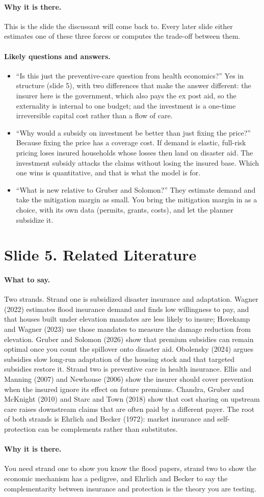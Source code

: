 \documentclass[11pt]{article}
\newcommand{\slide}[2]{\section*{Slide #1. #2}\addcontentsline{toc}{section}{Slide #1. #2}}
\newcommand{\say}{\paragraph{What to say.}}
\newcommand{\why}{\paragraph{Why it is there.}}
\newcommand{\qa}{\paragraph{Likely questions and answers.}}
\begin{document}
\why This is the slide the discussant will come back to. Every later slide either estimates one of these three forces or computes the trade-off between them.

\qa
\begin{itemize}
\item ``Is this just the preventive-care question from health economics?'' Yes in structure (slide 5), with two differences that make the answer different: the insurer here is the government, which also pays the ex post aid, so the externality is internal to one budget; and the investment is a one-time irreversible capital cost rather than a flow of care.
\item ``Why would a subsidy on investment be better than just fixing the price?'' Because fixing the price has a coverage cost. If demand is elastic, full-risk pricing loses insured households whose losses then land on disaster aid. The investment subsidy attacks the claims without losing the insured base. Which one wins is quantitative, and that is what the model is for.
\item ``What is new relative to Gruber and Solomon?'' They estimate demand and take the mitigation margin as small. You bring the mitigation margin in as a choice, with its own data (permits, grants, costs), and let the planner subsidize it.
\end{itemize}

\slide{5}{Related Literature}
\say Two strands. Strand one is subsidized disaster insurance and adaptation. Wagner (2022) estimates flood insurance demand and finds low willingness to pay, and that houses built under elevation mandates are less likely to insure; Hovekamp and Wagner (2023) use those mandates to measure the damage reduction from elevation. Gruber and Solomon (2026) show that premium subsidies can remain optimal once you count the spillover onto disaster aid. Obolensky (2024) argues subsidies slow long-run adaptation of the housing stock and that targeted subsidies restore it. Strand two is preventive care in health insurance. Ellis and Manning (2007) and Newhouse (2006) show the insurer should cover prevention when the insured ignore its effect on future premiums. Chandra, Gruber and McKnight (2010) and Starc and Town (2018) show that cost sharing on upstream care raises downstream claims that are often paid by a different payer. The root of both strands is Ehrlich and Becker (1972): market insurance and self-protection can be complements rather than substitutes.

\why You need strand one to show you know the flood papers, strand two to show the economic mechanism has a pedigree, and Ehrlich and Becker to say the complementarity between insurance and protection is the theory you are testing.
\end{document}
